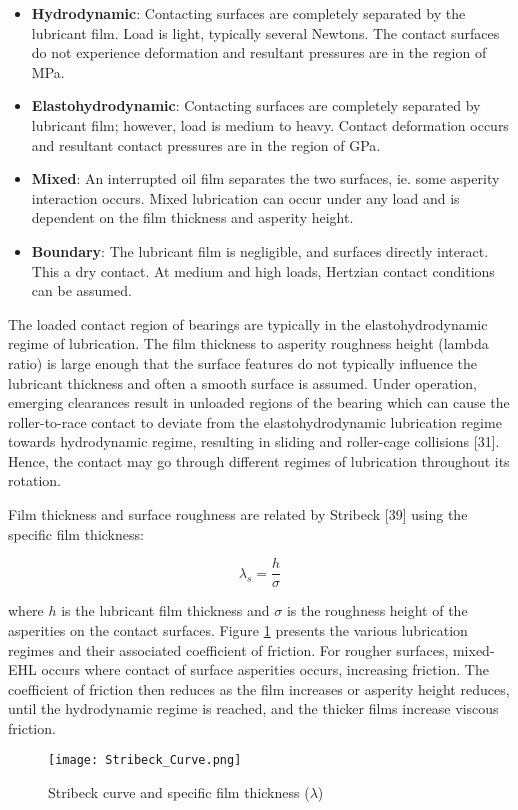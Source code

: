 \begin{itemize}
	\item \textbf{Hydrodynamic}: Contacting surfaces are completely separated by the lubricant film. Load is light, typically several Newtons. The contact surfaces do not experience deformation and resultant pressures are in the region of MPa.
	\item \textbf{Elastohydrodynamic}: Contacting surfaces are completely separated by lubricant film; however, load is medium to heavy. Contact deformation occurs and resultant contact pressures are in the region of GPa.
	\item \textbf{Mixed}: An interrupted oil film separates the two surfaces, ie. some asperity interaction occurs. Mixed lubrication can occur under any load and is dependent on the film thickness and asperity height.
	\item \textbf{Boundary}: The lubricant film is negligible, and surfaces directly interact. This a dry contact. At medium and high loads, Hertzian contact conditions can be assumed.
\end{itemize}

The loaded contact region of bearings are typically in the elastohydrodynamic regime of lubrication. The film thickness to asperity roughness height (lambda ratio) is large enough that the surface features do not typically influence the lubricant thickness and often a smooth surface is assumed. Under operation, emerging clearances result in unloaded regions of the bearing which can cause the roller-to-race contact to deviate from the elastohydrodynamic lubrication regime towards hydrodynamic regime, resulting in sliding and roller-cage collisions [31]. Hence, the contact may go through different regimes of lubrication throughout its rotation.

Film thickness and surface roughness are related by Stribeck [39] using the specific film thickness:

\begin{equation}\label{eq2.5}
	\lambda_s=\frac{h}{\sigma}
\end{equation}
 
 where $h$ is the lubricant film thickness and $\sigma$ is the roughness height of the asperities on the contact surfaces. Figure \ref{Stribeck_Curve} presents the various lubrication regimes and their associated coefficient of friction. For rougher surfaces, mixed-EHL occurs where contact of surface asperities occurs, increasing friction. The coefficient of friction then reduces as the film increases or asperity height reduces, until the hydrodynamic regime is reached, and the thicker films increase viscous friction.

\begin{figure}
	\centerline{\texttt{[image: Stribeck\_Curve.png]}}
	\caption{Stribeck curve and specific film thickness ($\lambda$) \cite{Ali2015}}
	\label{Stribeck_Curve}
\end{figure}
